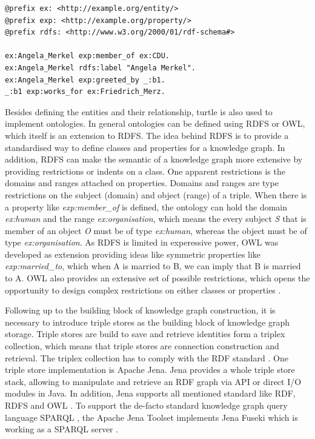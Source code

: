 \documentclass[a4paper,oneside,bibliography=totoc]{scrbook}
\begin{document}
\begin{lstlisting}[language=Turtle, caption=Example of a Knowledge Graph in Turtle Format, label=lst:turtle_example]
@prefix ex: <http://example.org/entity/>
@prefix exp: <http://example.org/property/>
@prefix rdfs: <http://www.w3.org/2000/01/rdf-schema#>

ex:Angela_Merkel exp:member_of ex:CDU.
ex:Angela_Merkel rdfs:label "Angela Merkel".
ex:Angela_Merkel exp:greeted_by _:b1.
_:b1 exp:works_for ex:Friedrich_Merz.
\end{lstlisting}

Besides defining the entities and their relationship, turtle is also used to implement ontologies. In general ontologies can be defined using \ac{RDFS} or \ac{OWL}, which itself is an extension to \ac{RDFS}. The idea behind \ac{RDFS} is to provide a standardised way to define classes and properties for a knowledge graph. In addition, \ac{RDFS} can make the semantic of a knowledge graph more extensive by providing restrictions or indents on a class. One apparent restrictions is the domains and ranges attached on properties. Domains and ranges are type restrictions on the subject (domain) and object (range) of a triple. When there is a property like \textit{exp:member\_of} is defined, the ontology can hold the domain \textit{ex:human} and the range \textit{ex:organisation}, which means the every subject \textit{S} that is member of an object \textit{O} must be of type \textit{ex:human}, whereas the object must be of type \textit{ex:organisation}. As \ac{RDFS} is limited in experessive power, \ac{OWL} was developed as extension providing ideas like symmetric properties like \textit{exp:married\_to}, which when A is married to B, we can imply that B is married to A. \ac{OWL} also provides an extensive set of possible restrictions, which opens the opportunity to design complex restrictions on either classes or properties \cite{VillazonTerrazas2017}.

Following up to the building block of knowledge graph construction, it is necessary to introduce triple stores as the building block of knowledge graph storage. Triple stores are build to save and retrieve identities form a triplex collection, which means that triple stores are connection construction and retrieval. The triplex collection has to comply with the \ac{RDF} standard \cite{Rusher2003}. One triple store implementation is Apache Jena. Jena provides a whole triple store stack, allowing to manipulate and retrieve an \ac{RDF} graph via API or direct I/O modules in Java. In addition, Jena supports all mentioned standard like \ac{RDF}, \ac{RDFS} and \ac{OWL} \cite{Carroll2004}. To support the de-facto standard knowledge graph query language \ac{SPARQL} \cite{VillazonTerrazas2017}, the Apache Jena Toolset implements Jena Fuseki which is working as a \ac{SPARQL} server \cite{Chokshi2022}.
\end{document}
